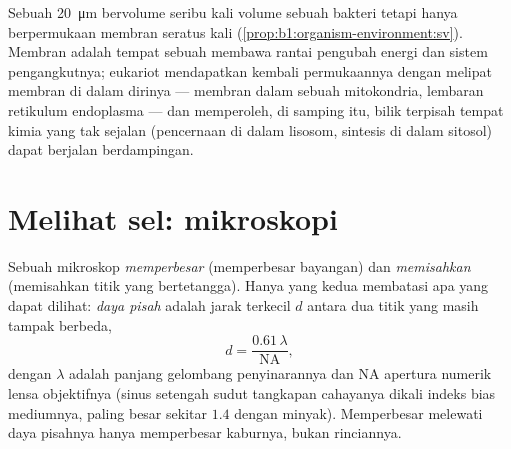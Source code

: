 \begin{example}\label{ex:b1:cell-unit-of-life:whycompart}
Sebuah  \qty{20}{\micro m} bervolume seribu kali volume sebuah
bakteri tetapi hanya berpermukaan membran seratus kali
(\cref{prop:b1:organism-environment:sv}). Membran adalah tempat sebuah
 membawa rantai pengubah energi dan sistem pengangkutnya; eukariot
mendapatkan kembali permukaannya dengan melipat membran di dalam dirinya
--- membran dalam sebuah mitokondria, lembaran retikulum endoplasma ---
dan memperoleh, di samping itu, bilik terpisah tempat kimia yang tak
sejalan (pencernaan di dalam lisosom, sintesis di dalam sitosol) dapat
berjalan berdampingan.
\end{example}

\section{Melihat sel: mikroskopi}

\begin{definition}\label{def:b1:cell-unit-of-life:resolution}
Sebuah mikroskop \emph{memperbesar} (memperbesar
bayangan) dan \emph{memisahkan} (memisahkan titik
yang bertetangga). Hanya yang kedua membatasi apa yang dapat dilihat:
\emph{daya pisah} adalah jarak terkecil $d$
antara dua titik yang masih tampak berbeda,
\[
d = \frac{0.61\,\lambda}{\mathrm{NA}},
\]
dengan $\lambda$ adalah panjang gelombang penyinarannya dan
$\mathrm{NA}$ apertura numerik lensa objektifnya (sinus setengah sudut
tangkapan cahayanya dikali indeks bias mediumnya, paling besar sekitar
$1.4$ dengan minyak). Memperbesar melewati daya pisahnya hanya
memperbesar kaburnya, bukan rinciannya.
\end{definition}

